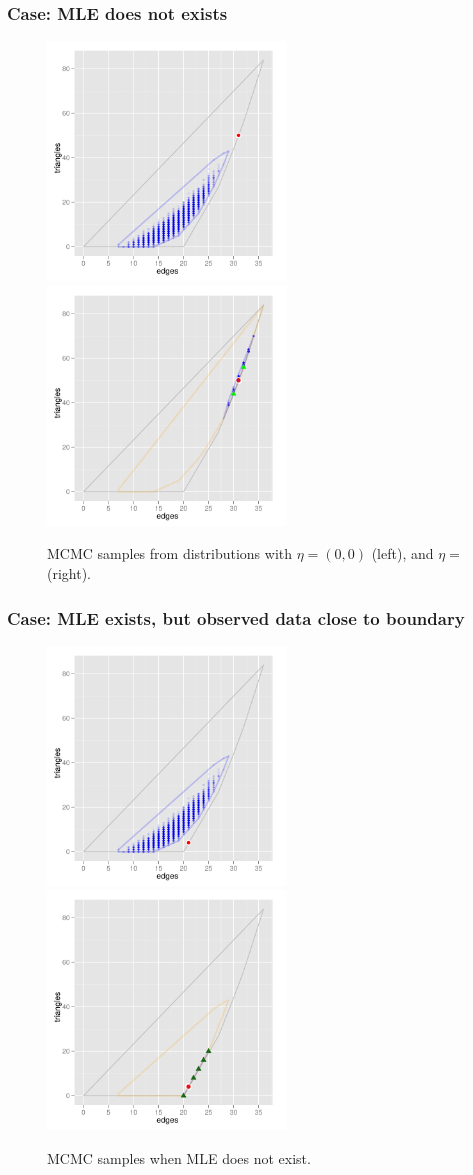 \documentclass[slidestop,compress, 10pt]{beamer}
\begin{document}
\frame
{
\frametitle{Case: MLE does not exists}  
\begin{figure}[h]
\centering
\includegraphics[height=2.5in]{MCsample-boundary}
\includegraphics[height=2.5in]{MCsample-77face}
\caption{MCMC samples from distributions with $\eta = (0,0)$ (left), and $\eta=$ (right).}
\label{F:MCsample-MLE nonexistent}
\end{figure}
}


\frame
{
\frametitle{Case: MLE exists, but observed data close to boundary}  
\begin{figure}[h]
\centering
\includegraphics[height=2.5in]{MCsample-problem}
\includegraphics[height=2.5in]{MCsample-fakeface}
\caption{MCMC samples when MLE does not exist.}
\label{F:MCsample-MLE problem}
\end{figure}
}
\end{document}
